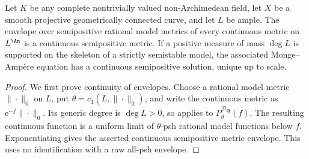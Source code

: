 \begin{theorem}\label{thm:curves-arbitrary-field-continuity}
Let \(K\) be any complete nontrivially valued non-Archimedean field, let
\(X\) be a smooth projective geometrically connected curve, and let
\(L\) be ample.  The envelope over semipositive rational model metrics
of every continuous metric on \(L^{\An}\) is a
continuous semipositive metric.  If a positive measure of mass \(\deg L\)
is supported on the skeleton of a strictly semistable model, the associated
Monge--Amp\`ere equation has a continuous semipositive solution, unique up
to scale.
\end{theorem}
\begin{proof}
We first prove continuity of envelopes.  Choose a rational model metric
$\|\cdot\|_0$ on $L$, put $\theta=c_1(L,\|\cdot\|_0)$, and write the
continuous metric as $\mathrm e^{-f}\|\cdot\|_0$.
Its generic degree is $\deg L>0$, so
 applies to
$P^{\mathcal D_{\mathbf Q}}_\theta(f)$.  The resulting continuous
function is a uniform limit of $\theta$-psh rational model functions
below $f$.  Exponentiating gives the asserted continuous semipositive
metric envelope.  This uses no identification with a raw all-psh envelope.


\end{proof}
